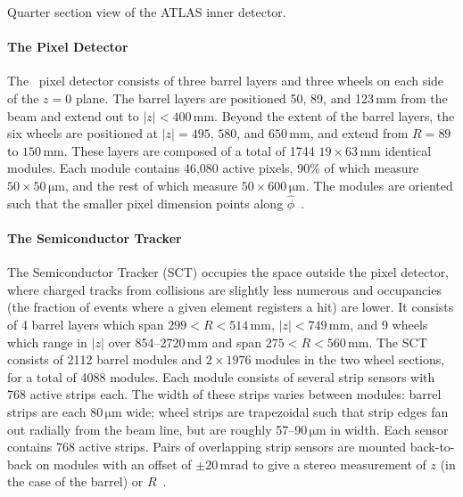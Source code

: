 \begin{cfig}
  \caption[ATLAS inner detector geometry]{Quarter section view of the ATLAS inner detector.}
  \label{fig:atlas-id-acceptance}
\end{cfig}


\paragraph{The Pixel Detector} The \atlas\ pixel detector consists of three barrel layers and three wheels on each side of the $z = 0$ plane.
The barrel layers are positioned 50, 89, and 123$\,\mathrm{mm}$ from the beam and extend out to $|z| < 400\,\mathrm{mm}$.
Beyond the extent of the barrel layers, the six wheels are positioned at $|z| = 495$, $580$, and $650\,\mathrm{mm}$, and extend from $R = 89$ to $150\,\mathrm{mm}$.
These layers are composed of a total of 1744 $19 \times 63\,\mathrm{mm}$ identical modules.
Each module contains 46,080 active pixels, 90\% of which measure $50 \times 50\,\mathrm{\mu m}$, and the rest of which measure $50 \times 600\,\mathrm{\mu m}$.
The modules are oriented such that the smaller pixel dimension points along $\hat{\phi}$~\cite{DetPap}.

\paragraph{The Semiconductor Tracker}
The Semiconductor Tracker (SCT) occupies the space outside the pixel detector, where charged tracks from collisions are slightly less numerous and occupancies (the fraction of events where a given element registers a hit) are lower.
It consists of 4 barrel layers which span $299 < R < 514\,\mathrm{mm}$, $|z| < 749\,\mathrm{mm}$, and 9 wheels which range in $|z|$ over 854--2720$\,\mathrm{mm}$ and span $275 < R < 560\,\mathrm{mm}$.
The SCT consists of 2112 barrel modules and $2 \times 1976$ modules in the two wheel sections, for a total of 4088 modules.
Each module consists of several strip sensors with 768 active strips each.
The width of these strips varies between modules: barrel strips are each $80\,\mathrm{\mu m}$ wide; wheel strips are trapezoidal such that strip edges fan out radially from the beam line, but are roughly 57--90$\,\mathrm{\mu m}$ in width.
Each sensor contains 768 active strips.
Pairs of overlapping strip sensors are mounted back-to-back on modules with an offset of $\pm 20\,\mathrm{mrad}$ to give a stereo measurement of $z$ (in the case of the barrel) or $R$~\cite{DetPap}.

